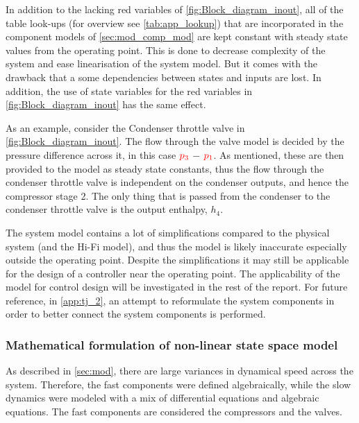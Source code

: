 In addition to the lacking red variables of \cref{fig:Block_diagram_inout}, all of the table look-ups (for overview see \cref{tab:app_lookup}) that are incorporated in the component models of \cref{sec:mod_comp_mod} are kept constant with steady state values from the operating point. This is done to decrease complexity of the system and ease linearisation of the system model. But it comes with the drawback that a some dependencies between states and inputs are lost.
In addition, the use of state variables for the red variables in \cref{fig:Block_diagram_inout} has the same effect.

\smallskip
As an example, consider the Condenser throttle valve in \cref{fig:Block_diagram_inout}. The flow through the valve model is decided by the pressure difference across it, in this case $ \color{red} p_3$ $ - $ $ \color{red} p_1 $. As mentioned, these are then provided to the model as steady state constants, thus the flow through the condenser throttle valve is independent on the condenser outputs, and hence the compressor stage 2. The only thing that is passed from the condenser to the condenser throttle valve is the output enthalpy, $ h_4 $.

\smallskip
The system model contains a lot of simplifications compared to the physical system (and the Hi-Fi model), and thus the model is likely inaccurate especially outside the operating point. Despite the simplifications it may still be applicable for the design of a controller near the operating point. The applicability of the model for control design will be investigated in the rest of the report. For future reference, in \cref{app:tj_2}, an attempt to reformulate the system components in order to better connect the system components is performed.


\subsubsection{Mathematical formulation of non-linear state space model} \label{sec:non_lin_model}
As described in \cref{sec:mod}, there are large variances in dynamical speed across the system. Therefore, the fast components were defined algebraically, while the slow dynamics were modeled with a mix of differential equations and algebraic equations. The fast components are considered the compressors and the valves.


